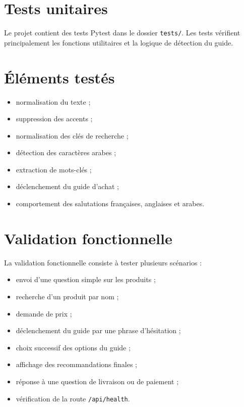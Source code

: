 \documentclass[12pt,a4paper]{report}
\begin{document}
\section{Tests unitaires}

Le projet contient des tests Pytest dans le dossier \texttt{tests/}. Les tests vérifient principalement les fonctions utilitaires et la logique de détection du guide.

\section{Éléments testés}

\begin{itemize}
    \item normalisation du texte ;
    \item suppression des accents ;
    \item normalisation des clés de recherche ;
    \item détection des caractères arabes ;
    \item extraction de mots-clés ;
    \item déclenchement du guide d'achat ;
    \item comportement des salutations françaises, anglaises et arabes.
\end{itemize}

\section{Validation fonctionnelle}

La validation fonctionnelle consiste à tester plusieurs scénarios :

\begin{itemize}
    \item envoi d'une question simple sur les produits ;
    \item recherche d'un produit par nom ;
    \item demande de prix ;
    \item déclenchement du guide par une phrase d'hésitation ;
    \item choix successif des options du guide ;
    \item affichage des recommandations finales ;
    \item réponse à une question de livraison ou de paiement ;
    \item vérification de la route \texttt{/api/health}.
\end{itemize}
\end{document}
